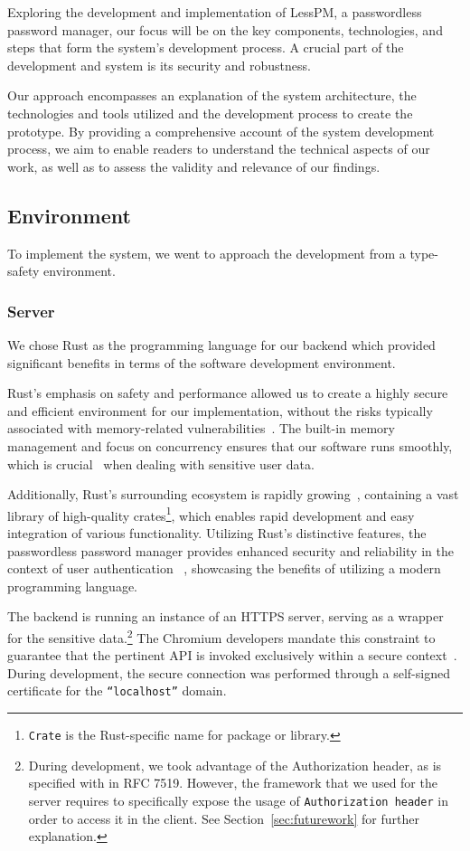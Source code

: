 Exploring the development and implementation of LessPM, a passwordless password
manager, our focus will be on the key components, technologies, and steps
that form the system's development process.
A crucial part of the development and system is its security and robustness.

Our approach encompasses an explanation of the system architecture, the
technologies and tools utilized and the development process to create the
prototype.
By providing a comprehensive account of the system development process, we
aim to enable readers to understand the technical aspects of our work, as well
as to assess the validity and relevance of our findings.

\subsection{Environment}\label{subsec:environment}
To implement the system, we went to approach the development from a type-safety
environment.

\subsubsection{Server}
We chose Rust as the programming language for our backend which provided
significant benefits in terms of the software development environment.

Rust's emphasis on safety and performance allowed us to create a highly
secure and efficient environment for our implementation, without the risks
typically associated with memory-related
vulnerabilities~\cite{rivera2019preserving}.
The built-in memory management and focus on concurrency ensures that our
software runs smoothly, which is crucial~\cite{fischer1985impossibility}
when dealing with sensitive user data.

Additionally, Rust's surrounding ecosystem is rapidly
growing~\cite{librs-stats}, containing a vast library of high-quality
crates\footnote{
  \texttt{Crate} is the Rust-specific name for package or library.
}, which enables rapid development and easy integration of various
functionality.
Utilizing Rust's distinctive features, the passwordless password manager provides
enhanced security and reliability in the context of user authentication
~\cite{rivera2019preserving}, showcasing the benefits of utilizing a modern
programming language.

The backend is running an instance of an HTTPS server, serving as a wrapper
for the sensitive data.\footnote{
  During development, we took advantage of the Authorization header, as is
  specified with in RFC 7519.
  However, the framework that we used for the server requires to specifically
  expose the usage of \texttt{Authorization header} in order to access it in the
  client.
  See Section~\ref{sec:futurework} for further explanation.
}
The Chromium developers mandate this constraint to guarantee that the pertinent
API is invoked exclusively within a secure context~\cite{webdev2021credential}.
During development, the secure connection was performed through a self-signed
certificate for the \texttt{``localhost''} domain.

